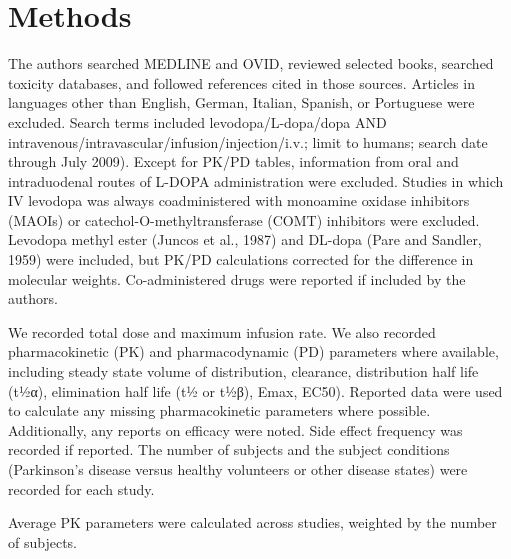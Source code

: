 \section{Methods}
The authors searched MEDLINE and OVID, reviewed selected books, searched toxicity databases, and followed references cited in those sources. Articles in languages other than English, German, Italian, Spanish, or Portuguese were excluded. Search terms included levodopa/L-dopa/dopa AND intravenous/intravascular/infusion/injection/i.v.; limit to humans; search date through July 2009).  Except for PK/PD tables, information from oral and intraduodenal routes of L-DOPA administration were excluded.  Studies in which IV levodopa was always coadministered with monoamine oxidase inhibitors (MAOIs) or catechol-O-methyltransferase (COMT) inhibitors were excluded.  Levodopa methyl ester (Juncos et al., 1987) and DL-dopa (Pare and Sandler, 1959) were included, but PK/PD calculations corrected for the difference in molecular weights.  Co-administered drugs were reported if included by the authors.

We recorded total dose and maximum infusion rate.  We also recorded pharmacokinetic (PK) and pharmacodynamic (PD) parameters where available, including steady state volume of distribution, clearance, distribution half life (t½α), elimination half life (t½ or t½β), Emax, EC50).   Reported data were used to calculate any missing pharmacokinetic parameters where possible.  Additionally, any reports on efficacy were noted.  Side effect frequency was recorded if reported. The number of subjects and the subject conditions (Parkinson’s disease versus healthy volunteers or other disease states) were recorded for each study. 

Average PK parameters were calculated across studies, weighted by the number of subjects.